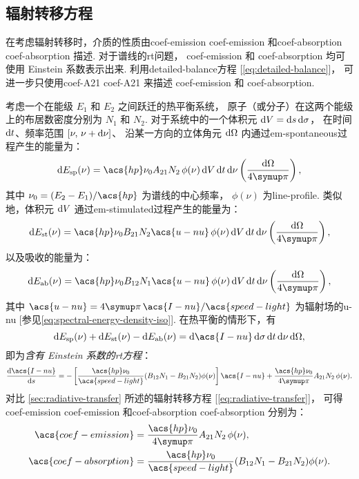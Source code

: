 \subsection{辐射转移方程}

在考虑辐射转移时，介质的性质由\acl{coef-emission} \acs{coef-emission}
和\acl{coef-absorption} \acs{coef-absorption} 描述.
对于谱线的\ac{rt}问题，
\acs{coef-emission} 和 \acs{coef-absorption} 均可使用 Einstein 系数表示出来.
利用\ac{detailed-balance}方程 [\autoref{eq:detailed-balance}]，
可进一步只使用\acl{coef-A21} \ac{coef-A21}
来描述 \acs{coef-emission} 和 \acs{coef-absorption}.

考虑一个在能级 $E_1$ 和 $E_2$ 之间跃迁的热平衡系统，
原子（或分子）在这两个能级上的布居数密度分别为 $N_1$ 和 $N_2$.
对于系统中的一个体积元 $\mathrm{d}V = \mathrm{d}s\,\mathrm{d}\sigma$，
在时间 $\mathrm{d}t$、频率范围 $[\nu, \,\nu+\mathrm{d}\nu]$、
沿某一方向的立体角元 $\mathrm{d}\Omega$ 内通过\ac{em-spontaneous}过程产生的能量为：
\begin{equation}
  \D{E_{\R{sp}}(\nu)}
    = \acs{hp} \nu_0 A_{21} N_2 \,\phi(\nu)
      \,\D{V}\,\D{t}\,\D{\nu} \left( \frac{\D{\Omega}}{4\Cpi} \right) ,
\end{equation}
其中 $\nu_0 = (E_2 - E_1) / \acs{hp}$ 为谱线的中心频率，
$\phi(\nu)$ 为\acf{line-profile}.
类似地，体积元 $\mathrm{d}V$ 通过\ac{em-stimulated}过程产生的能量为：
\begin{equation}
  \D{E_{\R{st}}(\nu)}
    = \acs{hp} \nu_0 B_{21} N_2 \acs{u-nu} \,\phi(\nu)
      \,\D{V}\,\D{t}\,\D{\nu} \left( \frac{\D{\Omega}}{4\Cpi} \right) ,
\end{equation}
以及吸收的能量为：
\begin{equation}
  \D{E_{\R{ab}}(\nu)}
    = \acs{hp} \nu_0 B_{12} N_1 \acs{u-nu} \,\phi(\nu)
      \,\D{V}\,\D{t}\,\D{\nu} \left( \frac{\D{\Omega}}{4\Cpi} \right) ,
\end{equation}
其中
$\acs{u-nu} = 4\Cpi\,\acs{I-nu} / \acs{speed-light}$
为辐射场的\acl{u-nu} [参见\autoref{eq:spectral-energy-density-iso}].
在热平衡的情形下，有
\begin{equation}
  \D{E_{\R{sp}}(\nu)} + \D{E_{\R{st}}(\nu)} - \D{E_{\R{ab}}(\nu)}
    = \D{\acs{I-nu}}\,\D{\sigma}\,\D{t}\,\D{\nu}\,\D{\Omega} ,
\end{equation}
即为\emph{含有 Einstein 系数的\ac{rt}方程}：
\begin{equation}
  \diff{\acs{I-nu}}{s}
    = - \left [ \frac{\acs{hp} \nu_0}{\acs{speed-light}}
      (B_{12} N_1 - B_{21} N_2) \phi(\nu) \right] \acs{I-nu}
      + \frac{\acs{hp} \nu_0}{4\Cpi} A_{21} N_2 \,\phi(\nu) .
\end{equation}
对比 \autoref{sec:radiative-transfer} 所述的辐射转移方程
[\autoref{eq:radiative-transfer}]，
可得\acl{coef-emission} \acs{coef-emission}
和\acl{coef-absorption} \acs{coef-absorption} 分别为：
\begin{align}
  \acs{coef-emission}
    & = \frac{\acs{hp} \nu_0}{4\Cpi} A_{21} N_2 \,\phi(\nu) ,
  \label{eq:coef-emission-einstein} \\
  \acs{coef-absorption}
    & = \frac{\acs{hp} \nu_0}{\acs{speed-light}}
      (B_{12} N_1 - B_{21} N_2) \phi(\nu) .
  \label{eq:coef-absorption-einstein1}
\end{align}

